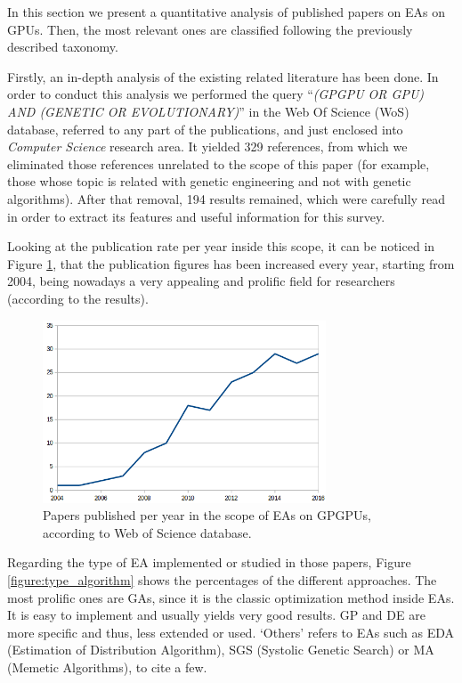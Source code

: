 \documentclass{article}
\begin{document}
In this section we present a quantitative analysis of published papers
on EAs on GPUs. Then, the most relevant ones are classified following
the previously described taxonomy.

Firstly, an in-depth analysis of the existing related literature has been done. In order to conduct this analysis we performed the query ``\textit{(GPGPU OR GPU) AND (GENETIC OR EVOLUTIONARY)}'' in the Web Of Science (WoS) \cite{wos} database, referred to any part of the publications, and just enclosed into {\em Computer Science} research area.
It yielded 329 references, from which we eliminated those references unrelated to the scope of this paper (for example, those whose topic is related with genetic engineering and not with genetic algorithms). After that removal, 194 results remained, which were carefully read in order to extract its features and useful information for this survey.

Looking at the publication rate per year inside this scope, it can be noticed in Figure \ref{figure:publications}, that the publication figures has been increased every year, starting from 2004, being nowadays a very appealing and prolific field for researchers  (according to the results).

\begin{figure}[!ht]
\centering
\includegraphics[width=0.75\textwidth]{years}
\caption{Papers published per year in the scope of EAs on GPGPUs, according to Web of Science database.}
\label{figure:publications}
\end{figure}


Regarding the type of EA implemented or studied in those papers,
Figure \ref{figure:type_algorithm} shows the percentages of the
different approaches. The most prolific ones are GAs, since it is the
classic optimization method inside EAs. It is easy to implement and
usually yields very good results.  GP and DE are more specific and
thus, less extended or used. `Others' refers to EAs such as EDA
(Estimation of Distribution Algorithm), SGS (Systolic Genetic Search)
or MA (Memetic Algorithms), to cite a few.  
\end{document}
